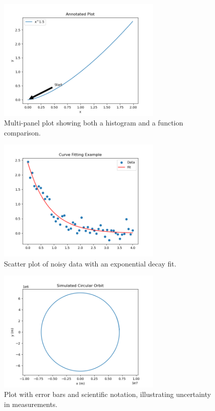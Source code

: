 \documentclass[12pt]{article}
\begin{document}
\begin{figure}[h!]
  \centering
  \includegraphics[width=0.7\textwidth]{../figures/Figure_5.png}
  \caption{Multi-panel plot showing both a histogram and a function comparison.}
\end{figure}

\begin{figure}[h!]
  \centering
  \includegraphics[width=0.7\textwidth]{../figures/Figure_6.png}
  \caption{Scatter plot of noisy data with an exponential decay fit.}
\end{figure}

\begin{figure}[h!]
  \centering
  \includegraphics[width=0.7\textwidth]{../figures/Figure_7.png}
  \caption{Plot with error bars and scientific notation, illustrating uncertainty in measurements.}
\end{figure}
\end{document}
